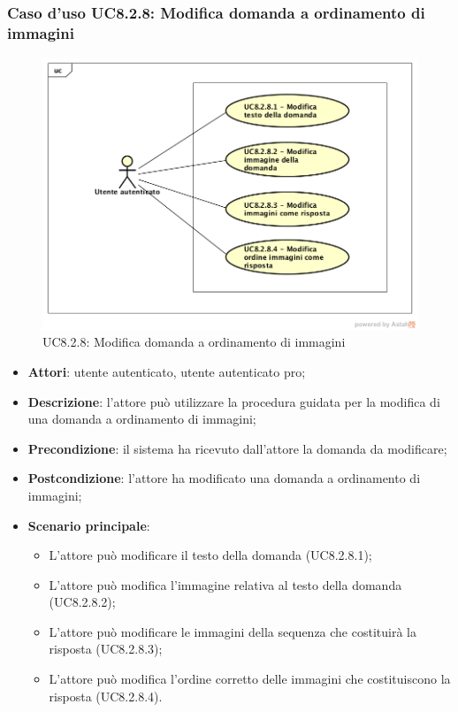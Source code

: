 \subsubsection{Caso d'uso UC8.2.8: Modifica domanda a ordinamento di immagini}
\label{UC8.2.8}
	\begin{figure}[h]
		\centering
			\includegraphics[scale=0.45,keepaspectratio]{UML/UC8_2_8.png}
		\caption{UC8.2.8: Modifica domanda a ordinamento di immagini}
	\end{figure}
\begin{itemize}
	\item\textbf{Attori}: utente autenticato, utente autenticato pro;
	\item\textbf{Descrizione}: l'attore può utilizzare la procedura guidata per la modifica di una domanda a ordinamento di immagini;
	\item\textbf{Precondizione}: il sistema ha ricevuto dall'attore la domanda da modificare; 
	\item \textbf{Postcondizione}: l'attore ha modificato una domanda a ordinamento di immagini;
	\item\textbf{Scenario principale}: 
	\begin{itemize}
		\item L'attore può modificare il testo della domanda (UC8.2.8.1);
		\item L'attore può modifica l'immagine relativa al testo della domanda (UC8.2.8.2);
		\item L'attore può modificare le immagini della sequenza che costituirà la risposta (UC8.2.8.3);
		\item L'attore può modifica l'ordine corretto delle immagini che costituiscono la risposta (UC8.2.8.4).
	\end{itemize}
\end{itemize}

